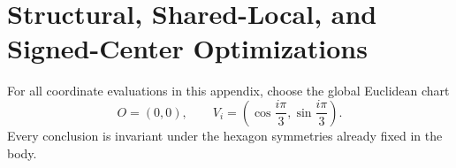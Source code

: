 \section{Structural, Shared-Local, and Signed-Center Optimizations}
\label{sec:appendix-structural-shared-signed}

For all coordinate evaluations in this appendix, choose the global Euclidean
chart
\[
 O=(0,0),
 \qquad
 V_i=\left(\cos\frac{i\pi}{3},\sin\frac{i\pi}{3}\right).
\]
Every conclusion is invariant under the hexagon symmetries already fixed in
the body.






